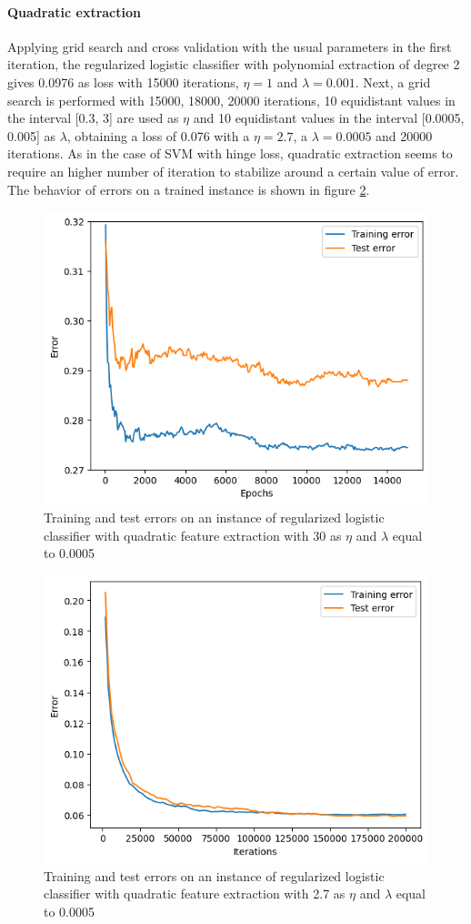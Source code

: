 \documentclass{article}
\begin{document}
\paragraph{Quadratic extraction}
Applying grid search and cross validation with the usual parameters in the first iteration, the regularized logistic classifier with polynomial extraction of degree 2 gives 0.0976 as loss with 15000 iterations, $\eta=1$ and $\lambda=0.001$. Next, a grid search is performed with 15000, 18000, 20000 iterations, 10 equidistant values in the interval [0.3, 3] are used as $\eta$ and 10 equidistant values in the interval [0.0005, 0.005] as $\lambda$, obtaining a loss of 0.076 with a $\eta=2.7$, a $\lambda=0.0005$ and 20000 iterations. As in the case of SVM with hinge loss, quadratic extraction seems to require an higher number of iteration to stabilize around a certain value of error. The behavior of errors on a trained instance is shown in figure \ref{fig:quad_svm_log}.
\begin{figure}
	\centering
	\includegraphics[width=0.5\columnwidth]{../plots/svm_log.png}
	\caption{Training and test errors on an instance of regularized logistic classifier with quadratic feature extraction with 30 as $\eta$ and $\lambda$ equal to 0.0005}
	\label{fig:svm_log}
\end{figure}
\begin{figure}
	\centering
	\includegraphics[width=0.5\columnwidth]{../plots/quad_svm_log.png}
	\caption{Training and test errors on an instance of regularized logistic classifier with quadratic feature extraction with 2.7 as $\eta$ and $\lambda$ equal to 0.0005}
	\label{fig:quad_svm_log}
\end{figure}
\end{document}
